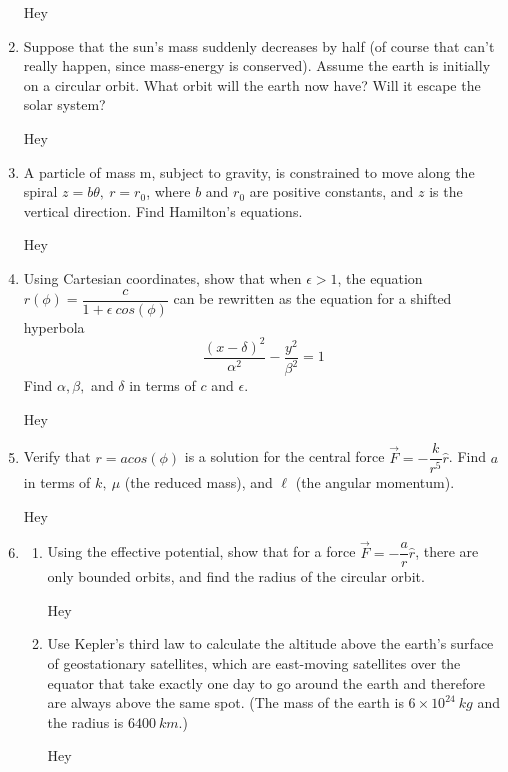 \documentclass[fleqn]{article}
\begin{document}
\begin{enumerate}
      \textcolor{hwColor}{
        Hey
      }

    \item Suppose that the sun’s mass suddenly decreases by half (of course that
    can’t really happen, since mass-energy is conserved). Assume the earth
    is initially on a circular orbit. What orbit will the earth now have? Will
    it escape the solar system?

      \textcolor{hwColor}{
        Hey
      }

    \item A particle of mass m, subject to gravity, is constrained to move along
    the spiral $z=b\theta, ~ r=r_0$, where $b$ and $r_0$ are positive constants, and $z$
    is the vertical direction. Find Hamilton’s equations. 

      \textcolor{hwColor}{
        Hey
      }

    \item Using Cartesian coordinates, show that when $\epsilon > 1$, the equation
    $r(\phi)=\dfrac{c}{1+ \epsilon ~ cos(\phi)}$ can be rewritten as the equation for a shifted hyperbola
    $$\dfrac{(x-\delta)^2}{\alpha^2}-\dfrac{y^2}{\beta^2}=1$$
    Find $\alpha, \beta,$ and $\delta$ in terms of $c$ and $\epsilon$.

      \textcolor{hwColor}{
        Hey
      }


    \item Verify that $r=a cos(\phi)$ is a solution for the central force 
    $\overrightarrow{F}=-\dfrac{k}{r^5} \hat{r}$. Find $a$ in terms of $k, ~ \mu$ 
    (the reduced mass), and $\ell$ (the angular momentum).

    \textcolor{hwColor}{
      Hey
    }


    \item \begin{enumerate}
      \item Using the effective potential, show that for a force $\overrightarrow{F}=-\dfrac{a}{r} \hat{r}$,
      there are only bounded orbits, and find the radius of the circular orbit.

        \textcolor{hwColor}{
          Hey
        }

      \item Use Kepler’s third law to calculate the altitude above the earth’s
      surface of geostationary satellites, which are east-moving satellites
      over the equator that take exactly one day to go around the earth
      and therefore are always above the same spot. (The mass of the
      earth is $6 \times 10^{24} ~ kg$ and the radius is $6400 ~ km$.)

        \textcolor{hwColor}{
          Hey
        }


    \end{enumerate}

  \end{enumerate}
\end{document}
